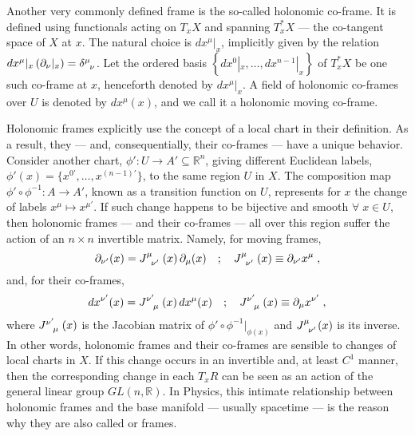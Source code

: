 \documentclass[../../main.tex]{subfiles}
\begin{document}
Another very commonly defined frame is the so-called holonomic co-frame. It is defined using functionals acting on $T_x X$ and spanning $T_x^{*} X$ --- the co-tangent space of $X$ at $x$. The natural choice is $dx^\mu|_x$, implicitly given by the relation $dx^\mu|_x \left(\partial_\nu|_x\right)=\tensor{\delta}{^\mu_\nu}$. Let the ordered basis $\left\{dx^0|_x,\ldots,dx^{n-1}|_x\right\}$ of $T^*_x X$ be one such co-frame at $x$, henceforth denoted by $dx^\mu|_x$. A field of holonomic co-frames over $U$ is denoted by $dx^\mu(x)$, and we call it a holonomic moving co-frame.

Holonomic frames explicitly use the concept of a local chart in their definition. As a result, they --- and, consequentially, their co-frames --- have a unique behavior. Consider another chart, $ \phi': U \rightarrow A' \subseteq \mathbb{R}^n $, giving different Euclidean labels, $ \phi'(x) = \{ x^{0'}, \ldots, x^{ \left( n-1 \right)' } \} $, to the same region $ U $ in $ X $. The composition map $ \phi' \circ \phi^{-1}: A \rightarrow A' $, known as a transition function on $U$, represents for $x$ the change of labels $ x^\mu \mapsto x^{ \mu' } $. If such change happens to be bijective and smooth $ \forall \; x \in U$, then holonomic frames --- and their co-frames --- all over this region suffer the action of an $ n \times n $ invertible matrix. Namely, for moving frames,
\begin{equation}
  \label{eq:holonomic-frame-transf-rule}
  \partial_{\nu'}(x) = \tensor{J}{^\mu_{\nu'}}\left(x\right) \partial_\mu(x) \quad ; \quad \tensor{J}{^\mu_{\nu'}}\left(x\right) \equiv \partial_{\nu'} x^\mu \;,
\end{equation}
and, for their co-frames,
\begin{equation}
  \label{eq:holonomic-coframe-transf-rule}
  dx^{\nu'}(x) = \tensor{J}{^{\nu'}_\mu}\left(x\right)dx^{\mu}(x) \quad ; \quad \tensor{J}{^{\nu'}_\mu}\left(x\right) \equiv \partial_\mu x^{\nu'} \;,
\end{equation}
where $\tensor{J}{^{\nu'}_\mu}\left(x\right)$ is the Jacobian matrix of $\phi'\circ {\phi}^{-1}|_{\phi(x)}$ and $\tensor{J}{^\mu_{\nu'}}(x)$ is its inverse. In other words, holonomic frames and their co-frames are sensible to changes of local charts in $X$. If this change occurs in an invertible and, at least $C^1$ manner, then the corresponding change in each $T_x R$ can be seen as an action of the general linear group $GL\left(n,\mathbb{R}\right)$. In Physics, this intimate relationship between holonomic frames and the base manifold --- usually spacetime --- is the reason why they are also called  or  frames.
\end{document}
